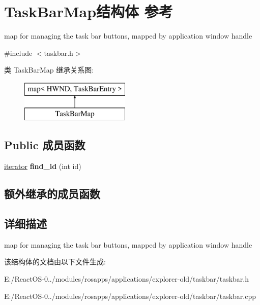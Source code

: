 \hypertarget{struct_task_bar_map}{}\section{Task\+Bar\+Map结构体 参考}
\label{struct_task_bar_map}


map for managing the task bar buttons, mapped by application window handle  




{\ttfamily \#include $<$taskbar.\+h$>$}

类 Task\+Bar\+Map 继承关系图\+:\begin{figure}[H]
\begin{center}
\leavevmode
\includegraphics[height=2.000000cm]{struct_task_bar_map}
\end{center}
\end{figure}
\subsection*{Public 成员函数}
\begin{DoxyCompactItemize}
\item 
\mbox{\label{struct_task_bar_map_aa971bfd84dbe4f345da60e375bc0b7d9}} 
\hyperlink{structiterator}{iterator} {\bfseries find\+\_\+id} (int id)
\end{DoxyCompactItemize}
\subsection*{额外继承的成员函数}


\subsection{详细描述}
map for managing the task bar buttons, mapped by application window handle 

该结构体的文档由以下文件生成\+:\begin{DoxyCompactItemize}
\item 
E\+:/\+React\+O\+S-\/0../modules/rosapps/applications/explorer-\/old/taskbar/taskbar.\+h\item 
E\+:/\+React\+O\+S-\/0../modules/rosapps/applications/explorer-\/old/taskbar/taskbar.\+cpp\end{DoxyCompactItemize}
